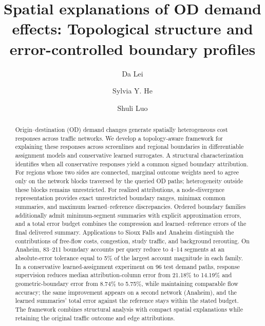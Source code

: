 \documentclass[a4paper,fleqn]{cas-sc}
\begin{document}
\title[mode=title]{Spatial explanations of OD demand effects: Topological structure and error-controlled boundary profiles}
\author[1]{Da Lei}
\author[2]{Sylvia Y. He}
\cormark[1]
\author[3]{Shuli Luo}
\begin{abstract}
Origin--destination (OD) demand changes generate spatially heterogeneous cost responses across traffic networks. We develop a topology-aware framework for explaining these responses across screenlines and regional boundaries in differentiable assignment models and conservative learned surrogates. A structural characterization identifies when all conservative responses yield a common signed boundary attribution. For regions whose two sides are connected, marginal outcome weights need to agree only on the network blocks traversed by the queried OD paths; heterogeneity outside these blocks remains unrestricted. For realized attributions, a node-divergence representation provides exact unrestricted boundary ranges, minimax common summaries, and maximum learned--reference discrepancies. Ordered boundary families additionally admit minimum-segment summaries with explicit approximation errors, and a total error budget combines the compression and learned--reference errors of the final delivered summary. Applications to Sioux Falls and Anaheim distinguish the contributions of free-flow costs, congestion, study traffic, and background rerouting. On Anaheim, 83--211 boundary accounts per query reduce to 4--14 segments at an absolute-error tolerance equal to 5\% of the largest account magnitude in each family. In a conservative learned-assignment experiment on 96 test demand paths, response supervision reduces median attribution-column error from 21.18\% to 14.19\% and geometric-boundary error from 8.74\% to 5.75\%, while maintaining comparable flow accuracy; the same improvement appears on a second network (Anaheim), and the learned summaries' total error against the reference stays within the stated budget. The framework combines structural analysis with compact spatial explanations while retaining the original traffic outcome and edge attributions.
\end{abstract}
\end{document}
